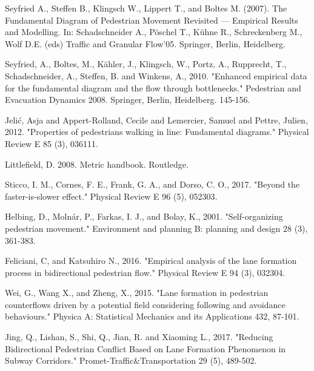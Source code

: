 \documentclass[preprint,12pt]{elsarticle}
\begin{document}
\begin{thebibliography}{10}
Seyfried A., Steffen B., Klingsch W., Lippert T., and Boltes M. (2007). The 
Fundamental Diagram of Pedestrian Movement Revisited — Empirical Results and 
Modelling. In: Schadschneider A., P\"oschel T., K\"uhne R., Schreckenberg M., 
Wolf D.E. (eds) Traffic and Granular Flow’05. Springer, Berlin, Heidelberg.

Seyfried, A., Boltes, M., K\"ahler, J., Klingsch, W., Portz, A., Rupprecht, 
T., Schadschneider, A., Steffen, B. and Winkens, A., 2010. "Enhanced empirical 
data for the fundamental diagram and the flow through bottlenecks." Pedestrian 
and Evacuation Dynamics 2008. Springer, Berlin, Heidelberg. 145-156.
{}

Jeli\'c, Asja and Appert-Rolland, Cecile and Lemercier, Samuel and Pettre, 
Julien, 2012. "Properties of pedestrians walking in line: Fundamental 
diagrams." Physical Review E 85 (3), 036111.
{}

Littlefield, D. 2008. Metric handbook. Routledge.
{}

Sticco, I. M., Cornes, F. E., Frank, G. A., and Dorso, C. O., 2017. "Beyond the 
faster-is-slower effect." Physical Review E 96 (5), 052303.
{}

Helbing, D., Moln\'ar, P., Farkas, I. J., and Bolay, K., 2001. "Self-organizing 
pedestrian movement." Environment and planning B: planning and design 
28 (3), 361-383.
{}

Feliciani, C, and Katsuhiro N., 2016. "Empirical analysis of the lane 
formation process in bidirectional pedestrian flow." Physical Review E 94 
(3), 032304.
{}

Wei, G., Wang X., and Zheng, X., 2015. "Lane formation in pedestrian 
counterflows driven by a potential field considering following and avoidance 
behaviours." Physica A: Statistical Mechanics and its Applications 432, 87-101.
{}

Jing, Q., Lishan, S., Shi, Q., Jian, R.  and Xiaoming L., 2017. 
"Reducing Bidirectional Pedestrian Conflict Based on Lane Formation Phenomenon 
in Subway Corridors." Promet-Traffic\&Transportation 29 (5), 489-502.
{}


\end{thebibliography}
\end{document}

